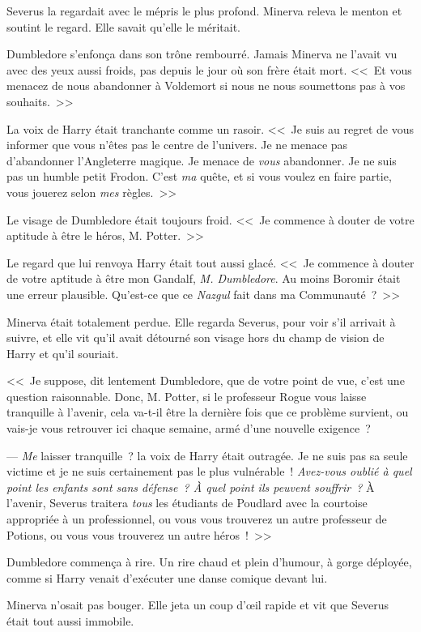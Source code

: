 Severus la regardait avec le mépris le plus profond. Minerva releva le menton et soutint le regard. Elle savait qu'elle le méritait.

Dumbledore s'enfonça dans son trône rembourré. Jamais Minerva ne l'avait vu avec des yeux aussi froids, pas depuis le jour où son frère était mort. <<~Et vous menacez de nous abandonner à Voldemort si nous ne nous soumettons pas à vos souhaits.~>>

La voix de Harry était tranchante comme un rasoir. <<~Je suis au regret de vous informer que vous n'êtes pas le centre de l'univers. Je ne menace pas d'abandonner l'Angleterre magique. Je menace de \emph{vous} abandonner. Je ne suis pas un humble petit Frodon. C'est \emph{ma} quête, et si vous voulez en faire partie, vous jouerez selon \emph{mes} règles.~>>

Le visage de Dumbledore était toujours froid. <<~Je commence à douter de votre aptitude à être le héros, M. Potter.~>>

Le regard que lui renvoya Harry était tout aussi glacé. <<~Je commence à douter de votre aptitude à être mon Gandalf, \emph{M. Dumbledore}. Au moins Boromir était une erreur plausible. Qu'est-ce que ce \emph{Nazgul} fait dans ma Communauté~?~>>

Minerva était totalement perdue. Elle regarda Severus, pour voir s'il arrivait à suivre, et elle vit qu'il avait détourné son visage hors du champ de vision de Harry et qu'il souriait.

<<~Je suppose, dit lentement Dumbledore, que de votre point de vue, c'est une question raisonnable. Donc, M. Potter, si le professeur Rogue vous laisse tranquille à l'avenir, cela va-t-il être la dernière fois que ce problème survient, ou vais-je vous retrouver ici chaque semaine, armé d'une nouvelle exigence~?

--- \emph{Me} laisser tranquille~? la voix de Harry était outragée. Je ne suis pas sa seule victime et je ne suis certainement pas le plus vulnérable~! \emph{Avez-vous oublié à quel point les enfants sont sans défense~? À quel point ils peuvent souffrir~?} À l'avenir, Severus traitera \emph{tous} les étudiants de Poudlard avec la courtoise appropriée à un professionnel, ou vous vous trouverez un autre professeur de Potions, ou vous vous trouverez un autre héros~!~>>

Dumbledore commença à rire. Un rire chaud et plein d'humour, à gorge déployée, comme si Harry venait d'exécuter une danse comique devant lui.

Minerva n'osait pas bouger. Elle jeta un coup d'œil rapide et vit que Severus était tout aussi immobile.


